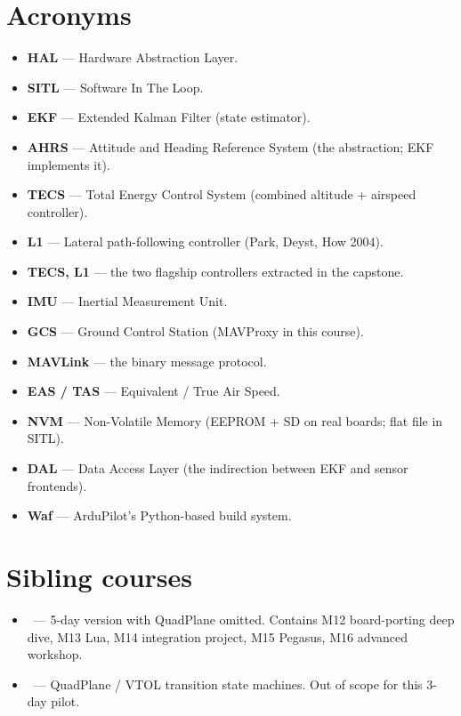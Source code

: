 \documentclass[a4paper,11pt,twoside]{article}
\begin{document}
\section*{Acronyms}
\begin{itemize}
  \item \textbf{HAL} --- Hardware Abstraction Layer.
  \item \textbf{SITL} --- Software In The Loop.
  \item \textbf{EKF} --- Extended Kalman Filter (state estimator).
  \item \textbf{AHRS} --- Attitude and Heading Reference System (the abstraction; EKF implements it).
  \item \textbf{TECS} --- Total Energy Control System (combined altitude + airspeed controller).
  \item \textbf{L1} --- Lateral path-following controller (Park, Deyst, How 2004).
  \item \textbf{TECS, L1} --- the two flagship controllers extracted in the capstone.
  \item \textbf{IMU} --- Inertial Measurement Unit.
  \item \textbf{GCS} --- Ground Control Station (MAVProxy in this course).
  \item \textbf{MAVLink} --- the binary message protocol.
  \item \textbf{EAS / TAS} --- Equivalent / True Air Speed.
  \item \textbf{NVM} --- Non-Volatile Memory (EEPROM + SD on real boards; flat file in SITL).
  \item \textbf{DAL} --- Data Access Layer (the indirection between EKF and sensor frontends).
  \item \textbf{Waf} --- ArduPilot's Python-based build system.
\end{itemize}

\section*{Sibling courses}
\begin{itemize}
  \item \siblingplane\ --- 5-day version with QuadPlane omitted. Contains M12 board-porting deep dive, M13 Lua, M14 integration project, M15 Pegasus, M16 advanced workshop.
  \item \siblingquadplane\ --- QuadPlane / VTOL transition state machines. Out of scope for this 3-day pilot.
\end{itemize}
\end{document}
